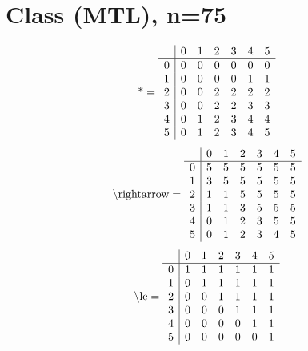 \documentclass[11pt]{article}
\begin{document}
\section{Class (MTL), n=75}
\[\text{*} = 
\begin{array}{r | r r r r r r}
 & 0 & 1 & 2 & 3 & 4 & 5 \\ \hline
0 & 0 & 0 & 0 & 0 & 0 & 0 \\
1 & 0 & 0 & 0 & 0 & 1 & 1 \\
2 & 0 & 0 & 2 & 2 & 2 & 2 \\
3 & 0 & 0 & 2 & 2 & 3 & 3 \\
4 & 0 & 1 & 2 & 3 & 4 & 4 \\
5 & 0 & 1 & 2 & 3 & 4 & 5 \\
\end{array}
\]
\[\text{\textbackslash rightarrow} = 
\begin{array}{r | r r r r r r}
 & 0 & 1 & 2 & 3 & 4 & 5 \\ \hline
0 & 5 & 5 & 5 & 5 & 5 & 5 \\
1 & 3 & 5 & 5 & 5 & 5 & 5 \\
2 & 1 & 1 & 5 & 5 & 5 & 5 \\
3 & 1 & 1 & 3 & 5 & 5 & 5 \\
4 & 0 & 1 & 2 & 3 & 5 & 5 \\
5 & 0 & 1 & 2 & 3 & 4 & 5 \\
\end{array}
\]
\[\text{\textbackslash le} = 
\begin{array}{r | r r r r r r}
 & 0 & 1 & 2 & 3 & 4 & 5 \\ \hline
0 & 1 & 1 & 1 & 1 & 1 & 1 \\
1 & 0 & 1 & 1 & 1 & 1 & 1 \\
2 & 0 & 0 & 1 & 1 & 1 & 1 \\
3 & 0 & 0 & 0 & 1 & 1 & 1 \\
4 & 0 & 0 & 0 & 0 & 1 & 1 \\
5 & 0 & 0 & 0 & 0 & 0 & 1 \\
\end{array}
\]
\end{document}
